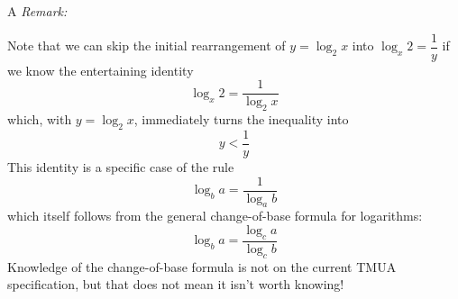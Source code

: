 \documentclass[11pt,a4paper]{article}
\begin{document}
\begin{enumerate}[label=\textbf{\arabic*.},leftmargin=*,itemsep=0pt,start=1]
\begin{djsSolution}{A}
\textit{Remark:}

Note that we can skip the initial rearrangement of \(y=\log_2 x\) into \(\log_x2 = \dfrac{1}{y}\) if we know the entertaining identity
\[ \log_x2=\frac{1}{\log_2x}\]
which, with $y=\log_2x$, immediately turns the inequality into 
\[y<\dfrac1y\]
This identity is a specific case of the rule
\[ \log_ba=\frac{1}{\log_ab}\]
which itself follows from the general change-of-base formula for logarithms:
\[ \log_ba=\frac{\log_ca}{\log_cb}\]
Knowledge of the change-of-base formula is not on the current TMUA specification, but that does not mean it isn't worth knowing!
\end{djsSolution}
\end{enumerate}
\clearpage
\thispagestyle{djssolutions}
\vspace*{8pt}
\end{document}
